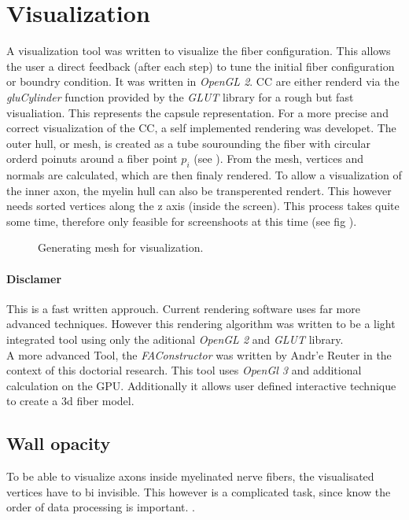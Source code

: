 \section{Visualization}
% 
A visualization tool was written to visualize the fiber configuration. This allows the user a direct feedback (\eg after each step) to tune the initial fiber configuration or boundry condition. It was written in \textit{OpenGL 2}.
% 
\ac{CC} are either renderd via the \textit{gluCylinder} function provided by the \textit{GLUT} library for a rough but fast visualiation. This represents the capsule representation. For a more precise and correct visualization of the \ac{CC}, a self implemented rendering was developet. The outer hull, or mesh, is created as a tube sourounding the fiber with circular orderd poinuts around a fiber point $p_i$ (see \dummy).
% 
From the mesh, vertices and normals are calculated, which are then finaly rendered. To allow a visualization of the inner axon, the myelin hull can also be transperented rendert. This however needs sorted vertices along the z axis (inside the screen). This process takes quite some time, therefore only feasible for screenshoots at this time (see fig \dummy).
% 
\begin{figure}[!t]
    \def\tikzwidth{\textwidth}
	\caption{Generating mesh for visualization.}
	\label{fig:vis_mesh}
\end{figure}
% 
\paragraph{Disclamer}
This is a fast written approuch. Current rendering software uses far more advanced techniques. However this rendering algorithm was written to be a light integrated tool using only the aditional \textit{OpenGL 2} and \textit{GLUT} library.\\
% 
A more advanced Tool, the \textit{FAConstructor} \cite{Reuter2019} was written by Andr'e Reuter in the context of this doctorial research. This tool uses \textit{OpenGl 3} and additional calculation on the GPU. Additionally it allows user defined interactive technique to create a 3d fiber model.
% 
\subsection{Wall opacity}
% 
To be able to visualize axons inside myelinated nerve fibers, the visualisated vertices have to bi invisible.
This however is a complicated task, since know the order of data processing is important.
\dummy.
% 
% 
% 
